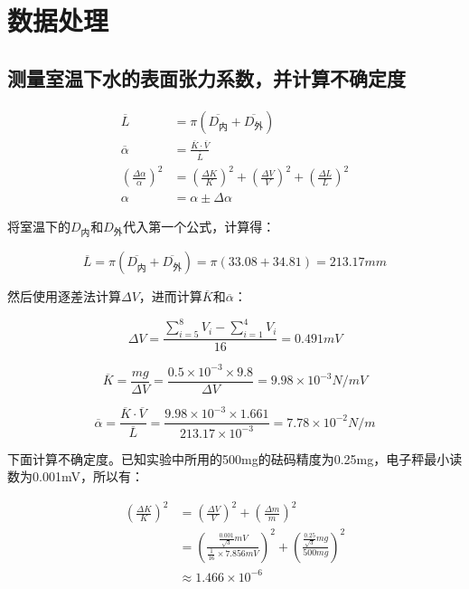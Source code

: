 \documentclass{ctexart}
\begin{document}
\newpage

\section{数据处理}
\subsection{测量室温下水的表面张力系数，并计算不确定度}

\begin{align*}
    \overline{L} &= \pi \left(\overline{D_{\text{内}}} + \overline{D_{\text{外}}}\right) \\
    \overline{\alpha} &= \frac{\overline{K} \cdot \overline{V}}{\overline{L}} \\
    \left(\frac{\Delta \alpha}{\alpha}\right)^2 &= \left(\frac{\Delta K}{K}\right)^2 + \left(\frac{\Delta V}{V}\right)^2 + \left(\frac{\Delta L}{L}\right)^2 \\
    \alpha &= \alpha \pm \Delta \alpha 
\end{align*}

将室温下的$D_{\text{内}}$和$D_{\text{外}}$代入第一个公式，计算得：

$$ \overline{L} = \pi \left(\overline{D_{\text{内}}} + \overline{D_{\text{外}}}\right) = \pi \left(33.08 + 34.81\right) = 213.17 mm $$

然后使用逐差法计算$\Delta V$，进而计算$\overline{K}$和$\overline{\alpha}$：

$$ \Delta V = \frac{\sum_{i = 5}^{8} V_i - \sum_{i = 1}^{4} V_i}{16} = 0.491 mV $$

$$ \overline{K} = \frac{mg}{\Delta V} = \frac{0.5 \times 10^{-3} \times 9.8}{\Delta V} = 9.98 \times 10^{-3} N/mV $$

$$ \overline{\alpha} = \frac{\overline{K} \cdot \overline{V}}{\overline{L}} = \frac{9.98 \times 10^{-3} \times 1.661}{213.17 \times 10^{-3}} = 7.78 \times 10^{-2} N/m $$

下面计算不确定度。已知实验中所用的500mg的砝码精度为0.25mg，电子秤最小读数为0.001mV，所以有：

\begin{align*}
\left(\frac{\Delta K}{K}\right)^2 &= \left(\frac{\Delta V}{V}\right)^2 + \left(\frac{\Delta m}{m}\right)^2 \\
&= \left(\frac{\frac{0.001}{\sqrt{3}}mV}{\frac{1}{16}\times7.856mV}\right)^2 + \left(\frac{\frac{0.25}{\sqrt{3}}mg}{500mg}\right)^2 \\
&\approx 1.466 \times 10^{-6}
\end{align*}
\end{document}

